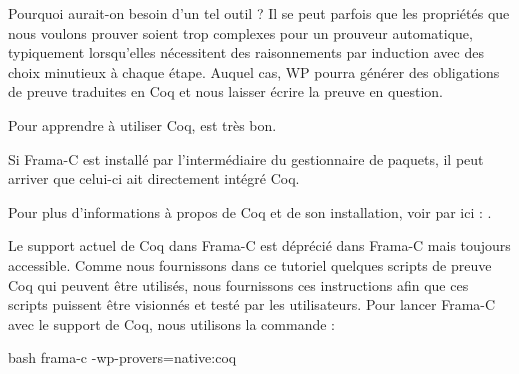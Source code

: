 Pourquoi aurait-on besoin d'un tel outil ? Il se peut parfois que les
propriétés que nous voulons prouver soient trop complexes pour un prouveur
automatique, typiquement lorsqu'elles nécessitent des raisonnements par
induction avec des choix minutieux à chaque étape. Auquel cas, WP pourra
générer des obligations de preuve traduites en Coq et nous laisser écrire
la preuve en question.



Pour apprendre à utiliser Coq,
est très bon.



\begin{Information}
Si Frama-C est installé par l'intermédiaire du gestionnaire de
paquets, il peut arriver que celui-ci ait directement intégré Coq.
\end{Information}


Pour plus d'informations à propos de Coq et de son installation, voir par
ici : .


Le support actuel de Coq dans Frama-C est déprécié dans Frama-C mais toujours
accessible. Comme nous fournissons dans ce tutoriel quelques scripts de preuve
Coq qui peuvent être utilisés, nous fournissons ces instructions afin que
ces scripts puissent être visionnés et testé par les utilisateurs. Pour lancer
Frama-C avec le support de Coq, nous utilisons la commande :


\begin{CodeBlock}{bash}
  frama-c -wp-provers=native:coq
\end{CodeBlock}

